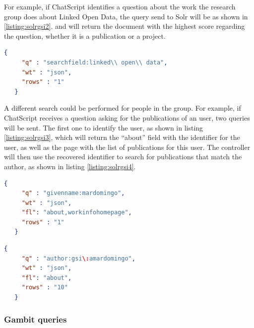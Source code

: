 For example, if ChatScript identifies a question about the work the research group does about Linked Open Data, the query send to Solr will be as shown in \ref{listing:solrgsi2}. and will return the document with the highest score regarding the question, whether it is a publication or a project.

\begin{center} 
  \begin{lstlisting}[language=json, caption=Example query asking for Linked Open Data, label=listing:solrgsi2]
   {
     "q" : "searchfield:linked\\ open\\ data",
     "wt" : "json",
     "rows" : "1"
   }  
  \end{lstlisting}
\end{center}

A different search could be performed for people in the group. For example, if ChatScript receives a question asking for the publications of an user, two queries will be sent. The first one to identify the user, as shown in listing \ref{listing:solrgsi3}, which will return the ``about'' field with the identifier for the user, as well as the page with the list of publications for this user. The controller will then use the recovered identifier to search for publications that match the author, as shown in listing \ref{listing:solrgsi4}.

\begin{center} 
  \begin{lstlisting}[language=json, caption=Query asking for the data about an user, label=listing:solrgsi3]
   {
     "q" : "givenname:mardomingo",
     "wt" : "json",
     "fl": "about,workinfohomepage",
     "rows" : "1"
   }  
  \end{lstlisting}
\end{center}

\begin{center} 
  \begin{lstlisting}[language=json, caption=Query asking for the data about an user, label=listing:solrgsi4]
   {
     "q" : "author:gsi\:amardomingo",
     "wt" : "json",
     "fl": "about",
     "rows" : "10"
   }  
  \end{lstlisting}
\end{center}

\subsubsection{Gambit queries}

